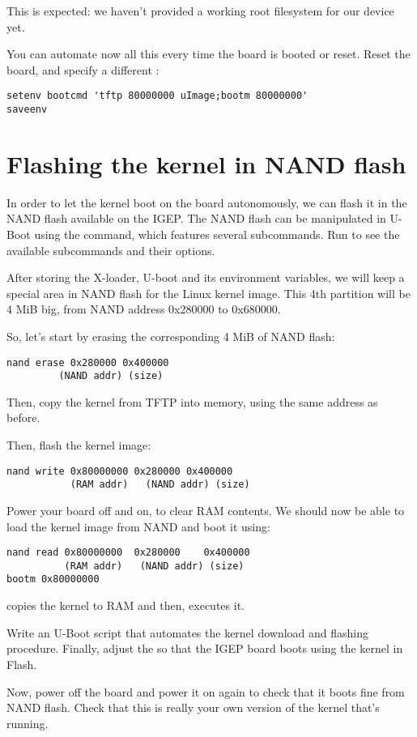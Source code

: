 This is expected: we haven't provided a working root filesystem for
our device yet.

You can automate now all this every time the board is booted or
reset. Reset the board, and specify a different :

\begin{verbatim}
setenv bootcmd 'tftp 80000000 uImage;bootm 80000000'
saveenv
\end{verbatim}

\section{Flashing the kernel in NAND flash}

In order to let the kernel boot on the board autonomously, we can
flash it in the NAND flash available on the IGEP. The NAND flash can
be manipulated in U-Boot using the  command, which
features several subcommands. Run  to see the
available subcommands and their options.

After storing the X-loader, U-boot and its environment variables, we
will keep a special area in NAND flash for the Linux kernel image.
This 4th partition will be 4 MiB big, from NAND address
0x280000 to 0x680000.

So, let's start by erasing the corresponding 4 MiB of NAND flash:

\begin{verbatim}
nand erase 0x280000 0x400000
         (NAND addr) (size)
\end{verbatim}

Then, copy the kernel from TFTP into memory, using the same address as
before.

Then, flash the kernel image:

\begin{verbatim}
nand write 0x80000000 0x280000 0x400000
           (RAM addr)   (NAND addr) (size)
\end{verbatim}

Power your board off and on, to clear RAM contents. We should now be able to load
the kernel image from NAND and boot it using:

\begin{verbatim}
nand read 0x80000000  0x280000    0x400000
          (RAM addr)   (NAND addr) (size)
bootm 0x80000000
\end{verbatim}

 copies the kernel to RAM and then, 
executes it.

Write an U-Boot script that automates the kernel download and flashing
procedure. Finally, adjust the  so that the IGEP board
boots using the kernel in Flash.

Now, power off the board and power it on again to check that it boots
fine from NAND flash. Check that this is really your own version of
the kernel that's running.
